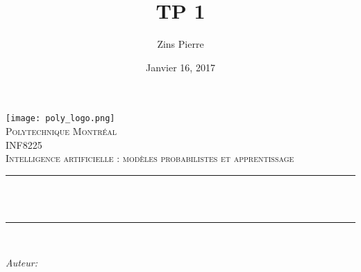 \documentclass[12pt]{article}
\title{TP 1}                %
\author{Zins Pierre}            %
\date{Janvier 16, 2017}             %
\makeatletter
\let\thetitle\@title
\let\theauthor\@author
\let\thedate\@date
\makeatother
\begin{document}

\begin{titlepage}
  \centering
    \vspace*{0.5 cm}
    \texttt{[image: poly\_logo.png]}\\[1.0 cm]  %
    \textsc{\LARGE Polytechnique Montréal}\\[2.0 cm]  %
  \textsc{\Large INF8225 }\\[0.5 cm]        %
  \textsc{Intelligence artificielle : modèles probabilistes et apprentissage}\\[0.5 cm]       %
  \rule{\linewidth}{0.2 mm} \\[0.4 cm]
  { \huge \bfseries \thetitle}\\
  \rule{\linewidth}{0.2 mm} \\[1.5 cm]
  
  \begin{minipage}{0.4\textwidth}
    \begin{flushleft} \large
      \emph{Auteur:}\\
      \theauthor
      \end{flushleft}
      \end{minipage}~
      \begin{minipage}{0.4\textwidth}
      \begin{flushright} \large
    \end{flushright}
  \end{minipage}\\[2 cm]
  
  {\large \thedate}\\[2 cm]
 
  \vfill
  
\end{titlepage}


\tableofcontents
\pagebreak


\end{document}
